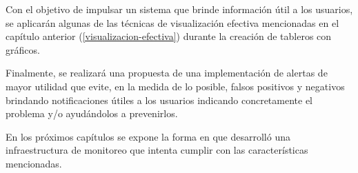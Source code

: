 Con el objetivo de impulsar un sistema que brinde información útil a los
usuarios, se aplicarán algunas de las técnicas de visualización efectiva
mencionadas en el capítulo anterior (\autoref{visualizacion-efectiva}) durante
la creación de tableros con gráficos.

Finalmente, se realizará una propuesta de una implementación de
alertas de mayor utilidad que evite, en la medida de lo posible, falsos
positivos y negativos brindando notificaciones útiles a los usuarios indicando
concretamente el problema y/o ayudándolos a prevenirlos.

En los próximos capítulos se expone la forma en que desarrolló una
infraestructura de monitoreo que intenta cumplir con las características
mencionadas.
